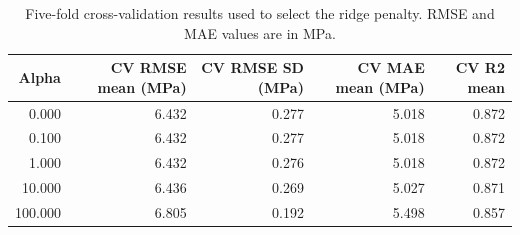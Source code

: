 \begin{table}
\caption{Five-fold cross-validation results used to select the ridge penalty. RMSE and MAE values are in MPa.}
\label{tab:supplementary-cv}
\begin{tabular}{rrrrr}
\toprule
Alpha & CV RMSE mean (MPa) & CV RMSE SD (MPa) & CV MAE mean (MPa) & CV R2 mean \\
\midrule
0.000 & 6.432 & 0.277 & 5.018 & 0.872 \\
0.100 & 6.432 & 0.277 & 5.018 & 0.872 \\
1.000 & 6.432 & 0.276 & 5.018 & 0.872 \\
10.000 & 6.436 & 0.269 & 5.027 & 0.871 \\
100.000 & 6.805 & 0.192 & 5.498 & 0.857 \\
\bottomrule
\end{tabular}
\end{table}
